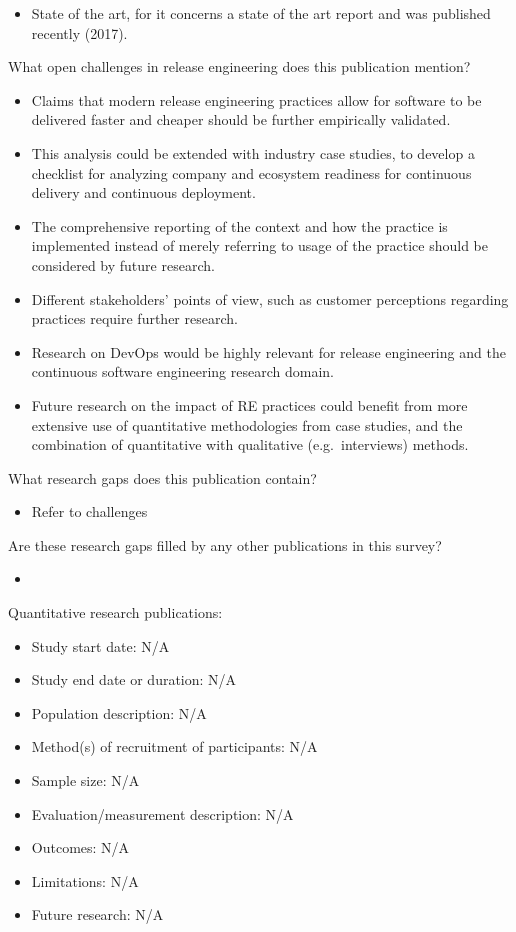 \documentclass[]{book}
\providecommand{\tightlist}{%
  \setlength{\itemsep}{0pt}\setlength{\parskip}{0pt}}
\begin{document}
\begin{itemize}
\tightlist
\item
  State of the art, for it concerns a state of the art report and was
  published recently (2017).
\end{itemize}

What open challenges in release engineering does this publication
mention?

\begin{itemize}
\tightlist
\item
  Claims that modern release engineering practices allow for software to
  be delivered faster and cheaper should be further empirically
  validated.
\item
  This analysis could be extended with industry case studies, to develop
  a checklist for analyzing company and ecosystem readiness for
  continuous delivery and continuous deployment.
\item
  The comprehensive reporting of the context and how the practice is
  implemented instead of merely referring to usage of the practice
  should be considered by future research.
\item
  Different stakeholders' points of view, such as customer perceptions
  regarding practices require further research.
\item
  Research on DevOps would be highly relevant for release engineering
  and the continuous software engineering research domain.
\item
  Future research on the impact of RE practices could benefit from more
  extensive use of quantitative methodologies from case studies, and the
  combination of quantitative with qualitative (e.g.~interviews)
  methods.
\end{itemize}

What research gaps does this publication contain?

\begin{itemize}
\tightlist
\item
  Refer to challenges
\end{itemize}

Are these research gaps filled by any other publications in this survey?

\begin{itemize}
\item
\end{itemize}

Quantitative research publications:

\begin{itemize}
\tightlist
\item
  Study start date: N/A
\item
  Study end date or duration: N/A
\item
  Population description: N/A
\item
  Method(s) of recruitment of participants: N/A
\item
  Sample size: N/A
\item
  Evaluation/measurement description: N/A
\item
  Outcomes: N/A
\item
  Limitations: N/A
\item
  Future research: N/A
\end{itemize}
\end{document}
